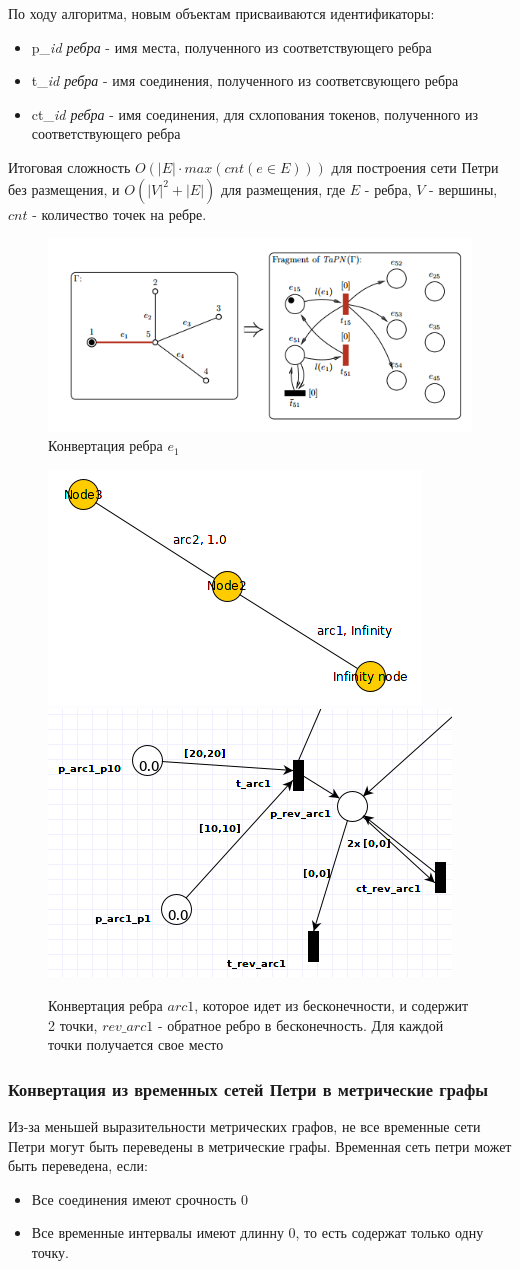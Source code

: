 \documentclass{../TechDoc}
\begin{document}
	По ходу алгоритма, новым объектам присваиваются идентификаторы:
		\begin{itemize}
			\item p\_\textit{id ребра} - имя места, полученного из соответствующего ребра
			\item t\_\textit{id ребра} - имя соединения, полученного из соответсвующего ребра
			\item ct\_\textit{id ребра} - имя соединения, для схлопования токенов, полученного из соответствующего ребра
		\end{itemize}

	Итоговая сложность $O(|E| \cdot max(cnt(e \in E)))$ для построения сети Петри без размещения, и $O(|V|^2 + |E|)$ для размещения, где $E$ - ребра, $V$ - вершины, $cnt$ - количество точек на ребре.
	\begin{figure}
		\centering
		\includegraphics[width=0.5\linewidth]{mg_to_tapn_simple}
		\caption{Конвертация ребра $e_1$}
		\label{fig:mgtotapnsimple}
	\end{figure}
	\begin{figure}
		\centering
		\includegraphics[width=0.3\linewidth]{mg_with_lead}
		\includegraphics[width=0.3\linewidth]{mg_to_tapn_lead}
		\caption{Конвертация ребра $arc1$, которое идет из бесконечности, и содержит 2 точки, $rev\_arc1$ - обратное ребро в бесконечность. Для каждой точки получается свое место}
		\label{fig:mgtotapnlead}
	\end{figure}
	

	\subsubsection{Конвертация из временных сетей Петри в метрические графы\cite{CorMgTapn}}
		Из-за меньшей выразительности метрических графов, не все временные сети Петри могут быть переведены в метрические графы.
		Временная сеть петри может быть переведена, если:
		\begin{itemize}
			\item Все соединения имеют срочность 0
			\item Все временные интервалы имеют длинну 0, то есть содержат только одну точку.
		\end{itemize}
		
\end{document}
